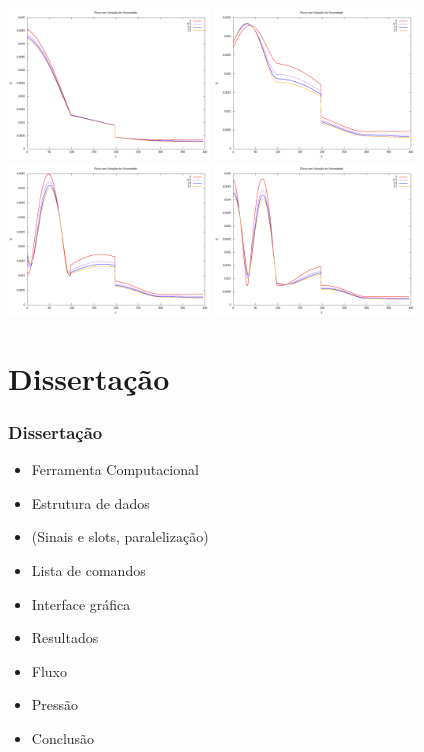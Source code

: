 \documentclass[10pt]{beamer}
\theoremstyle{remark}
\theoremstyle{definition}
\begin{document}
\begin{frame}[allowframebreaks]
		\begin{center}
			\includegraphics[width=0.4\textwidth]{images/60.png}
			\includegraphics[width=0.4\textwidth]{images/61.png}
			\includegraphics[width=0.4\textwidth]{images/62.png}
			\includegraphics[width=0.4\textwidth]{images/63.png}
		\end{center}
	
	\end{frame}
	
	\section{Dissertação}
	\begin{frame}[allowframebreaks]
		\frametitle{Dissertação}
		
		\begin{itemize}
			\item Ferramenta Computacional
			\item Estrutura de dados
			\item  (Sinais e slots, paralelização)
			\item Lista de comandos
			\item Interface gráfica
			\item Resultados
			\item Fluxo
			\item Pressão
			\item Conclusão
		\end{itemize}
		
	\end{frame}
	
\end{document}
